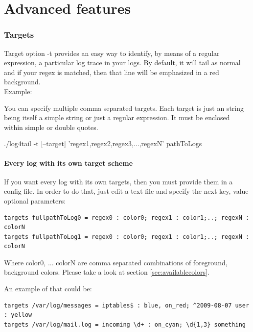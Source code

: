 \part{Advanced features}
\section{Targets}
\label{sec:Targets} Target option -t provides an easy way to identify, by means
of a regular expression, a particular log trace in your logs. By default, it
will tail as normal and if your regex is matched, then that line will be
emphasized in a red background.\\
Example:\\

You can specify multiple comma separated targets. Each target is just an string
being itself a simple string or just a regular expression. It must be enclosed
within simple or double quotes.
\begin{cmd}
 ./log4tail -t [--target] 'regex1,regex2,regex3,...,regexN' pathToLogs
\end{cmd}

\subsection{Every log with its own target scheme}
If you want every log with its own targets, then you must provide them in a
config file.  In order to do that, just edit a text file and specify the next
key, value optional parameters:

\begin{config}
\begin{verbatim}
targets fullpathToLog0 = regex0 : color0; regex1 : color1;..; regexN : colorN
targets fullpathToLog1 = regex0 : color0; regex1 : color1;..; regexN : colorN
\end{verbatim}
\end{config}

Where color0, ... colorN are comma separated combinations of foreground,
background colors. Please take a look at section \ref{sec:availablecolors}.

An example of that could be:

\begin{config}
\begin{verbatim}
targets /var/log/messages = iptables$ : blue, on_red; ^2009-08-07 user : yellow
targets /var/log/mail.log = incoming \d+ : on_cyan; \d{1,3} something 
\end{verbatim}
\end{config}

